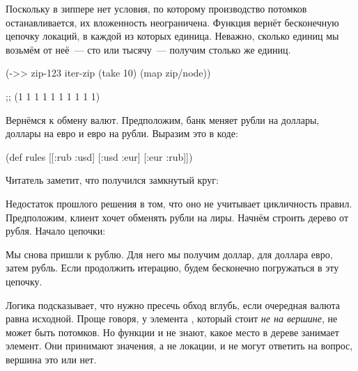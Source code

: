 Поскольку в зиппере нет условия, по которому производство потомков
останавливается, их вложенность неограничена. Функция  вернёт
бесконечную цепочку локаций, в каждой из которых единица. Неважно, сколько
единиц мы возьмём от неё~--- сто или тысячу~--- получим столько же единиц.

\begin{english}
  \begin{clojure}
(->> zip-123
     iter-zip
     (take 10)
     (map zip/node))

;; (1 1 1 1 1 1 1 1 1 1)
  \end{clojure}
\end{english}

Вернёмся к обмену валют. Предположим, банк меняет рубли на доллары, доллары на
евро и евро на рубли. Выразим это в коде:

\begin{english}
  \begin{clojure}
(def rules
  [[:rub :usd]
   [:usd :eur]
   [:eur :rub]])
  \end{clojure}
\end{english}

Читатель заметит, что получился замкнутый круг:



Недостаток прошлого решения в том, что оно не учитывает цикличность
правил. Предположим, клиент хочет обменять рубли на лиры. Начнём строить дерево
от рубля. Начало цепочки:



Мы снова пришли к рублю. Для него мы получим доллар, для доллара евро, затем
рубль. Если продолжить итерацию, будем бесконечно погружаться в эту цепочку.

Логика подсказывает, что нужно пресечь обход вглубь, если очередная валюта равна
исходной. Проще говоря, у элемента , который стоит \emph{не на вершине}, не
может быть потомков. Но функции  и  не знают, какое
место в дереве занимает элемент. Они принимают значения, а не локации, и не
могут ответить на вопрос, вершина это или нет.

